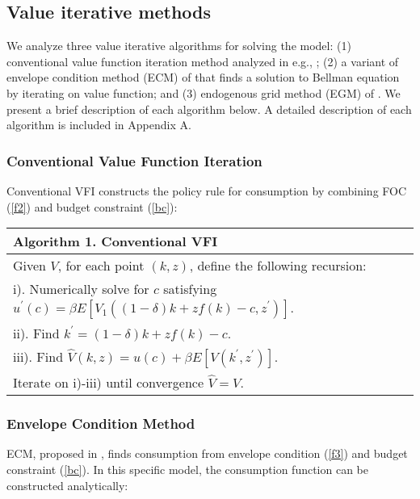 \subsection{Value iterative methods}

We analyze three value iterative algorithms for solving the model: (1)
conventional value function iteration method analyzed in e.g., \cite{AF2014} ;
(2) a variant of envelope condition method (ECM) of \cite{MM2013} that finds a
solution to Bellman equation by iterating on value function; and (3) endogenous
grid method (EGM) of \cite{Carroll2006}. We present a brief description of each
algorithm below. A detailed description of each algorithm is included in
Appendix A.

\subsubsection{Conventional Value Function Iteration}

Conventional VFI constructs the policy rule for consumption by combining FOC
(\ref{f2}) and budget constraint (\ref{bc}):

\qquad \newline
{\small
\begin{tabular}{l}
\hline \hline
\textbf{Algorithm 1. Conventional VFI} \\ \hline
Given $V$, for each point $\left( k,z\right) $, define the following recursion: \\
\quad i). Numerically solve for $c$ satisfying $u^{\prime }\left(c\right) =\beta E \left[ V_{1}\left( \left( 1-\delta \right) k+zf\left( k\right) -c,z^{\prime }\right) \right] $. \\
\quad ii). Find $k^{\prime }=\left( 1-\delta \right) k+zf\left( k\right) -c$. \\
\quad iii). Find $\widehat{V}\left( k,z\right) =u\left( c\right) +\beta E \left[ V\left( k^{\prime },z^{\prime }\right) \right] $. \\
Iterate on i)-iii) until convergence $\widehat{V}=V$. \\ \hline \hline
\end{tabular}
}

\qquad \newline

\subsubsection{Envelope Condition Method}

ECM, proposed in \cite{MM2013}, finds consumption from envelope
condition (\ref{f3}) and budget constraint (\ref{bc}). In this specific model,
the consumption function can be constructed analytically:

